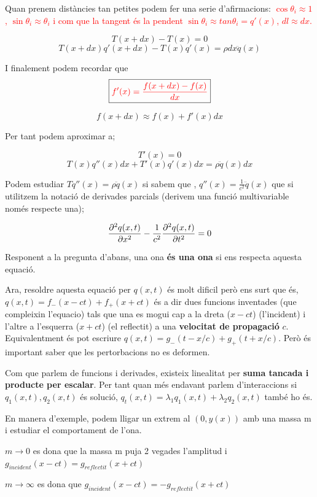 \documentclass[12pt]{article}
\begin{document}
Quan prenem distàncies tan petites podem fer una serie d'afirmacions: \textcolor{red}{$\cos \theta_i \approx 1$, $\sin \theta_i \approx \theta_i$ i com que la tangent és la pendent $\sin \theta_i \approx tan\theta_i = q'(x)$, $dl \approx dx$.}

\[T(x+dx) - T(x) = 0\]
\[T(x+dx)q'(x+dx) - T(x)q'(x) = \rho dx \ddot{q}(x)\]

I finalement podem recordar que
\[\boxed{\textcolor{red}{f'(x) = \frac{f(x+dx) - f(x)}{dx}}}\]

\[\boxed{f(x+dx) \approx f(x) + f'(x)dx}\]

Per tant podem aproximar a;

\[T'(x) = 0\]
\[T(x) q''(x)dx + T'(x)q'(x) dx = \rho \ddot{q}(x)dx\]

Podem estudiar $Tq''(x) = \rho \ddot{q}(x)$ si sabem que , $q''(x) = \frac{1}{c^2} \ddot{q}(x)$ que si utilitzem la notació de derivades parcials (derivem una funció multivariable només respecte una);

\[\pdv[2]{q(x,t)}{x} - \frac{1}{c^2}\pdv[2]{q(x,t)}{t} = 0\]

Responent a la pregunta d'abans, una ona \textbf{és una ona} si ens respecta aquesta equació.

Ara, resoldre aquesta equació per $q(x,t)$ és molt dificil però ens surt que és, $q(x,t) = f_-(x-ct) + f_+(x+ct)$ és a dir dues funcions inventades (que compleixin l'equacio) tals que una es mogui cap a la dreta ($x-ct$) (l'incident) i l'altre a l'esquerra ($x+ct$) (el reflectit) a una \textbf{velocitat de propagació} $c$. Equivalentment és pot escriure $q(x,t) = g_-(t-x/c) + g_+(t+x/c)$. Però és important saber que les pertorbacions no es deformen.

Com que parlem de funcions i derivades, existeix linealitat per \textbf{suma tancada i producte per escalar}. Per tant quan més endavant parlem d'interaccions si $q_1(x,t), q_2(x,t)$ és solució, $q_t(x,t) = \lambda_1 q_1(x,t) + \lambda_2 q_2(x,t)$ també ho és.

En manera d'exemple, podem lligar un extrem al $(0, y(x))$ amb una massa m i estudiar el comportament  de l'ona.

\noindent $m \rightarrow 0$ es dona que la massa m puja 2 vegades l'amplitud i $g_{incident}(x-ct) = g_{reflectit}(x+ct)$

\noindent $m \rightarrow \infty$ es dona que $g_{incident}(x-ct) = - g_{reflectit}(x+ct)$
\end{document}
